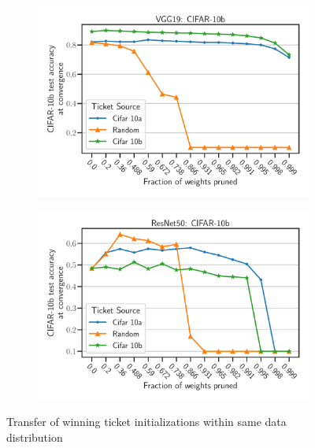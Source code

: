     \begin{figure}[h]
            \begin{subfigure}[b]{0.45\textwidth}
                    \includegraphics[width=\linewidth]{../openreview/plots/Exp1_VGG_N.pdf}

            \end{subfigure}
            \begin{subfigure}[b]{0.45\textwidth}
                    \includegraphics[width=\linewidth]{../openreview/plots/Exp1_ResNet_N.pdf}
            \end{subfigure}
        \caption{Transfer of winning ticket initializations within same data distribution}
        \label{fig:exp1}
    \end{figure}


